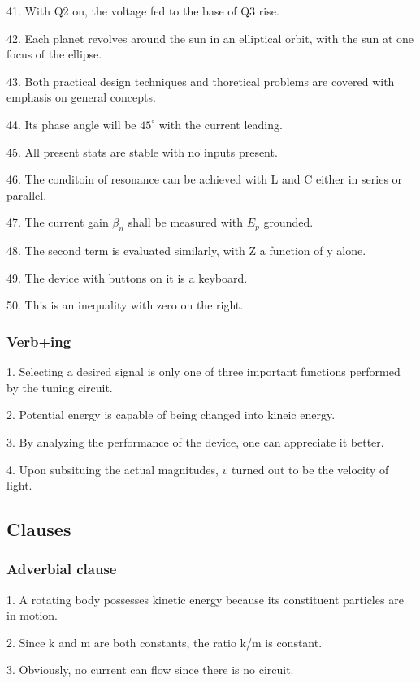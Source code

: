 \documentclass[a4paper,twocolumn,10pt]{article}
\begin{document}
\begin{CJK}{UTF8}{gkai}
	41. With Q2 on, the voltage fed to the base of Q3 rise.

	42. Each planet revolves around the sun in an elliptical orbit, with the
	sun at one focus of the ellipse.

	43. Both practical design techniques and thoretical problems are covered with emphasis
	on general concepts.

	44. Its phase angle will be $45^\circ$ with the current leading.

	45. All present stats are stable with no inputs present.

	46. The conditoin of resonance can be achieved with L and C
	either in series or parallel.

	47. The current gain $\beta_n$ shall be measured with $E_p$ grounded.

	48. The second term is evaluated similarly, with Z a function of y alone.

	49. The device with buttons on it is a keyboard.

	50. This is an inequality with zero on the right.

	\subsubsection{Verb+ing}

	1. Selecting a desired signal is only one of three important functions performed by the tuning circuit.

	2. Potential energy is capable of being changed into kineic energy.

	3. By analyzing the performance of the device, one can appreciate it better.

	4. Upon subsituing the actual magnitudes, $v$ turned out to be the velocity of light.

	\subsection{Clauses}

	\subsubsection{Adverbial clause}

	1. A rotating body possesses kinetic energy because its constituent particles are in motion.

	2. Since k and m are both constants, the ratio k/m is constant.

	3. Obviously, no current can flow since there is no circuit.


\end{CJK}
\end{document}
